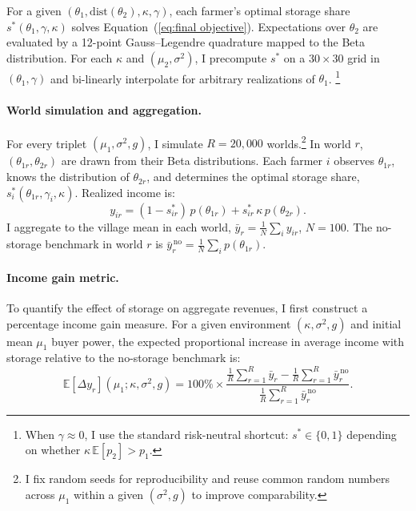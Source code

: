 For a given $(\theta_1,\text{dist}(\theta_2),\kappa,\gamma)$, each farmer's optimal storage share $s^*(\theta_1,\gamma,\kappa)$ solves Equation~(\ref{eq:final objective}). Expectations over $\theta_2$ are evaluated by a 12-point Gauss--Legendre quadrature mapped to the Beta distribution. For each $\kappa$ and $(\mu_2,\sigma^2)$, I precompute $s^*$ on a $30\times 30$ grid in $(\theta_1,\gamma)$ and bi-linearly interpolate for arbitrary realizations of $\theta_1$. \footnote{When $\gamma\approx 0$, I use the standard risk-neutral shortcut: $s^*\in\{0,1\}$ depending on whether $\kappa\,\mathbb{E}[p_2]>p_1$.}

\paragraph{World simulation and aggregation.}
For every triplet $(\mu_1,\sigma^2,g)$, I simulate $R=20{,}000$ worlds.\footnote{I fix random seeds for reproducibility and reuse common random numbers across $\mu_1$ within a given $(\sigma^2,g)$ to improve comparability.} In world $r$, $(\theta_{1r},\theta_{2r})$ are drawn from their Beta distributions. Each farmer $i$ observes $\theta_{1r}$, knows the distribution of $\theta_{2r}$, and determines the optimal storage share, $s^*_i(\theta_{1r},\gamma_i,\kappa)$. Realized income is:
$$
y_{ir}=(1-s^*_{ir})\,p(\theta_{1r})+s^*_{ir}\,\kappa\,p(\theta_{2r}).
$$
I aggregate to the village mean in each world, $\bar y_r=\frac{1}{N}\sum_i y_{ir}$, $N=100$. The no-storage benchmark in world $r$ is $\bar y^{\,\text{no}}_r=\frac{1}{N}\sum_i p(\theta_{1r})$.



\paragraph{Income gain metric.}  
To quantify the effect of storage on aggregate revenues, I first construct a percentage income gain measure. For a given environment $(\kappa,\sigma^2,g)$ and initial mean $\mu_1$ buyer power, the expected proportional increase in average income with storage relative to the no-storage benchmark is:
\begin{equation}
\mathbb{E}[\Delta y_r](\mu_1;\kappa,\sigma^2,g)
=100\%\times
\frac{\frac{1}{R}\sum_{r=1}^R \bar y_{r}-\frac{1}{R}\sum_{r=1}^R \bar y^{\,\text{no}}_{r}}
{\frac{1}{R}\sum_{r=1}^R \bar y^{\,\text{no}}_{r}}.
\end{equation}

